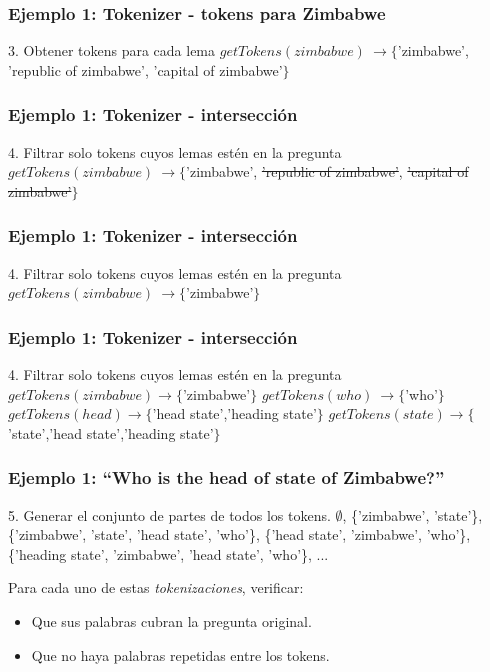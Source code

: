 \begin{frame}[t]
\frametitle{Ejemplo 1: Tokenizer - tokens para Zimbabwe}
3. Obtener tokens para cada lema \newline
  \Large{$getTokens(zimbabwe)\ \rightarrow \{$'zimbabwe', 'republic of zimbabwe', 'capital of zimbabwe'$\}$}

\end{frame}

\begin{frame}[t]
\frametitle{Ejemplo 1: Tokenizer - intersección}
4. Filtrar solo tokens cuyos lemas estén en la pregunta\newline
  \Large{$getTokens(zimbabwe)\ \rightarrow \{$'zimbabwe', {\color{red}\st{'republic of zimbabwe'}}, {\color{red}\st{'capital of zimbabwe'}}$\}$ }
\end{frame}


\begin{frame}[t]
\frametitle{Ejemplo 1: Tokenizer - intersección}
4. Filtrar solo tokens cuyos lemas estén en la pregunta\newline
  \Large{$getTokens(zimbabwe)\ \rightarrow \{$'zimbabwe'$\}$}
\end{frame}


\begin{frame}[t]
\frametitle{Ejemplo 1: Tokenizer - intersección}
4. Filtrar solo tokens cuyos lemas estén en la pregunta\newline
  \Large{
    $getTokens(zimbabwe) \rightarrow \{$'zimbabwe'$\}$\newline
    $getTokens(who)\ \rightarrow \{$'who'$\}$\newline
    $getTokens(head) \rightarrow \{$'head state','heading state'$\}$\newline
    $getTokens(state) \rightarrow  \{$'state','head state','heading state'$\}$
}
\end{frame}

\begin{frame}[t]
\frametitle{Ejemplo 1: ``Who is the head of state of Zimbabwe?''}
 5. Generar el conjunto de partes de todos los tokens.\newline
  \Large{
      $\emptyset$,\newline
      \{'zimbabwe', 'state'\},\newline
      \{'zimbabwe', '{\color{red}state}', 'head {\color{red}state}', 'who'\},\newline
      \{'head state', 'zimbabwe', 'who'\},\newline
      \{'{\color{red}heading state}', 'zimbabwe', '{\color{red}head state}', 'who'\},\newline
      ...
  }\newline

  \normalsize{Para cada uno de estas \textit{tokenizaciones}, verificar:
  \begin{itemize}
    \item Que sus palabras cubran la pregunta original.
    \item Que no haya palabras repetidas entre los tokens.
  \end{itemize}
  }
\end{frame}

